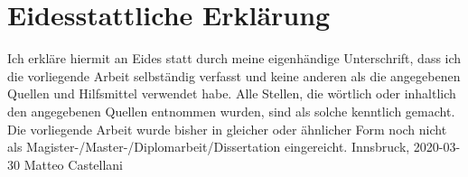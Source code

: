\chapter*{Eidesstattliche Erklärung}
\thispagestyle{plain}

Ich erkläre hiermit an Eides statt durch meine eigenhändige Unterschrift, dass ich die vorliegende Arbeit selbständig verfasst und keine anderen als die angegebenen Quellen und Hilfsmittel verwendet habe. Alle Stellen, die wörtlich oder inhaltlich den angegebenen Quellen entnommen wurden, sind als solche kenntlich gemacht.
Die vorliegende Arbeit wurde bisher in gleicher oder ähnlicher Form noch nicht als Magister-/Master-/Diplomarbeit/Dissertation eingereicht.
\newline
\newline
Innsbruck, 2020-03-30
\newline
Matteo Castellani